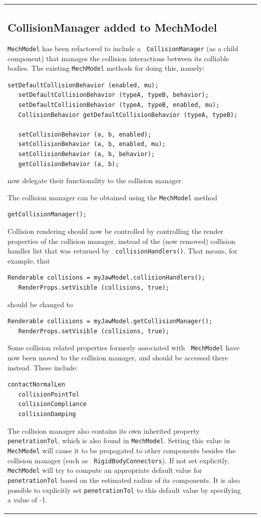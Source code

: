 \documentclass{article}
\begin{document}
\begin{tabular}{ll}
\subsection*{CollisionManager added to MechModel}

{\tt MechModel} has been refactored to include a {\tt
CollisionManager} (as a child component) that manages the collision
interactions between its colliable bodies. The existing
{\tt MechModel} methods for doing this, namely:
\begin{lstlisting}[]
   setDefaultCollisionBehavior (enabled, mu);
   setDefaultCollisionBehavior (typeA, typeB, behavior);
   setDefaultCollisionBehavior (typeA, typeB, enabled, mu);
   CollisionBehavior getDefaultCollisionBehavior (typeA, typeB);

   setCollisionBehavior (a, b, enabled);
   setCollisionBehavior (a, b, enabled, mu);
   setCollisionBehavior (a, b, behavior);
   getCollisionBehavior (a, b);
\end{lstlisting}
now delegate their functionality to the collision manager.

The collision manager can be obtained using the {\tt MechModel} method
\begin{lstlisting}[]
   getCollisionManager();
\end{lstlisting}
Collision rendering should now be controlled by controlling the render
properties of the collision manager, instead of the (now removed)
collision handler list that was returned by {\tt
collisionHandlers()}. That means, for example, that
\begin{lstlisting}[]
   Renderable collisions = myJawModel.collisionHandlers();
   RenderProps.setVisible (collisions, true);
\end{lstlisting}
should be changed to 
\begin{lstlisting}[]
   Renderable collisions = myJawModel.getCollisionManager();
   RenderProps.setVisible (collisions, true);
\end{lstlisting}

Some collision related properties formerly associated with {\tt
MechModel} have now been moved to the collision manager, and should be
accessed there instead. These include:
\begin{lstlisting}[]
   contactNormalLen
   collisionPointTol
   collisionCompliance
   collisionDamping
\end{lstlisting}

The collision manager also contains its own inherited property {\tt
penetrationTol}, which is also found in {\tt MechModel}. Setting this
value in {\tt MechModel} will cause it to be propagated to other
components besides the collision manager (such as {\tt
RigidBodyConnectors}). If not set explicitly, {\tt MechModel} will try
to compute an appropriate default value for {\tt penetrationTol} based
on the estimated radius of its components.  It is also possible to
explicitly set {\tt penetrationTol} to this default value by
specifying a value of -1.


\end{tabular}
\end{document}
